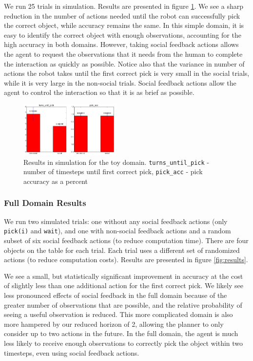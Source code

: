 \documentclass{article}
\begin{document}
\begin{multicols}{2}
We run 25 trials in simulation. Results are presented in figure \ref{fig:toyresults}. We see a sharp reduction in the number of actions needed until the robot can successfully pick the correct object, while accuracy remains the same. In this simple domain, it is easy to identify the correct object with enough observations, accounting for the high accuracy in both domains. However, taking social feedback actions allows the agent to request the observations that it needs from the human to complete the interaction as quickly as possible. Notice also that the variance in number of actions the robot takes until the first correct pick is very small in the social trials, while it is very large in the non-social trials. Social feedback actions allow the agent to control the interaction so that it is as brief as possible. 

\begin{figure}[H]
\begin{center}
	\includegraphics[width=0.45\textwidth]{toy_results}
\end{center}
\caption{Results in simulation for the toy domain. \texttt{turns\_until\_pick} - number of timesteps until first correct pick,  \texttt{pick\_acc} - pick accuracy as a percent}
	\label{fig:toyresults}
\end{figure}

\subsubsection{Full Domain Results}


We run two simulated trials: one without any social feedback actions (only \texttt{pick(i)} and \texttt{wait}), and one with non-social feedback actions and a random subset of six social feedback actions (to reduce computation time). There are four objects on the table for each trial. Each trial uses a different set of randomized actions (to reduce computation costs). Results are presented in figure \ref{fig:results}. 

We see a small, but statistically significant improvement in accuracy at the cost of slightly less than one additional action for the first correct pick.  We likely see less pronounced effects of social feedback in the full domain because of the greater number of observations that are possible, and the relative probability of seeing a useful observation is reduced. This more complicated domain is also more hampered by our reduced horizon of 2, allowing the planner to only consider up to two actions in the future. In the full domain, the agent is much less likely to receive enough observations to correctly pick the object within two timesteps, even using social feedback actions. 


\end{multicols}
\end{document}
